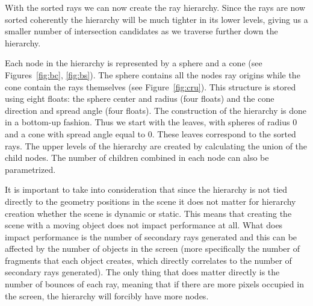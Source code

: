 With the sorted rays we can now create the ray hierarchy. Since the rays are now sorted coherently the hierarchy will be much tighter in its lower levels, giving us a smaller number of intersection candidates as we traverse further down the hierarchy.

\medskip

Each node in the hierarchy is represented by a sphere and a cone (see Figures~\ref{fig:bc}, \ref{fig:bs}).
The sphere contains all the nodes ray origins while the cone contain the rays themselves (see Figure~\ref{fig:cru}). This structure is stored using eight floats: the sphere center and radius (four floats) and the cone direction and spread angle (four floats). The construction of the hierarchy is done in a bottom-up fashion. Thus we start with the leaves, with spheres of radius $0$ and a cone with spread angle equal to $0$. These leaves correspond to the sorted rays. The upper levels of the hierarchy are created by calculating the union of the child nodes. The number of children combined in each node can also be parametrized. 


\medskip

It is important to take into consideration that since the hierarchy is not tied directly to the geometry positions in the scene it does not matter for hierarchy creation whether the scene is dynamic or static. This means that creating the scene with a moving object does not impact performance at all. What does impact performance is the number of secondary rays generated and this can be affected by the number of objects in the screen (more specifically the number of fragments that each object creates, which directly correlates to the number of secondary rays generated). The only thing that does matter directly is the number of bounces of each ray, meaning that if there are more pixels occupied in the screen, the hierarchy will forcibly have more nodes.

\medskip

